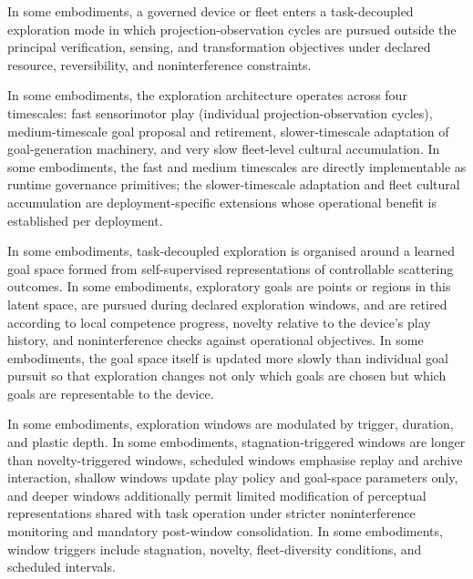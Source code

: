 \documentclass[a4paper,12pt]{article}
\begin{document}

In some embodiments, a governed device or fleet enters a
task-decoupled exploration mode in which projection-observation cycles
are pursued outside the principal verification, sensing, and
transformation objectives under declared resource, reversibility, and
noninterference constraints.

In some embodiments, the exploration architecture operates across four
timescales: fast sensorimotor play (individual projection-observation
cycles), medium-timescale goal proposal and retirement,
slower-timescale adaptation of goal-generation machinery, and very
slow fleet-level cultural accumulation. In some embodiments, the
fast and medium timescales are directly implementable as runtime
governance primitives; the slower-timescale adaptation and fleet
cultural accumulation are deployment-specific extensions whose
operational benefit is established per deployment.

In some embodiments, task-decoupled exploration is organised around a
learned goal space formed from self-supervised representations of
controllable scattering outcomes. In some embodiments, exploratory
goals are points or regions in this latent space, are pursued during
declared exploration windows, and are retired according to local
competence progress, novelty relative to the device's play history,
and noninterference checks against operational objectives. In some
embodiments, the goal space itself is updated more slowly than
individual goal pursuit so that exploration changes not only which
goals are chosen but which goals are representable to the device.

In some embodiments, exploration windows are modulated by trigger,
duration, and plastic depth. In some embodiments, stagnation-triggered
windows are longer than novelty-triggered windows, scheduled windows
emphasise replay and archive interaction, shallow windows update play
policy and goal-space parameters only, and deeper windows additionally
permit limited modification of perceptual representations shared with
task operation under stricter noninterference monitoring and mandatory
post-window consolidation. In some embodiments, window triggers
include stagnation, novelty, fleet-diversity conditions, and scheduled
intervals.
\end{document}

